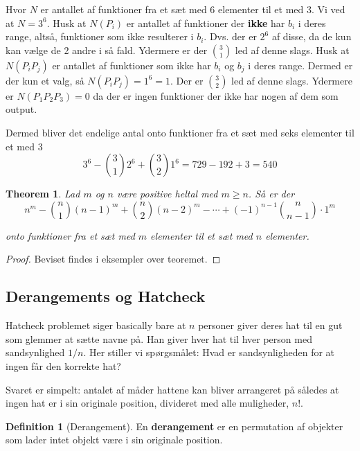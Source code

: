 \documentclass[11pt]{article}
\newtheorem{theorem}{Theorem}
\theoremstyle{definition}
\newtheorem{definition}{Definition}
\theoremstyle{remark}
\begin{document}
Hvor $N$ er antallet af funktioner fra et sæt med 6 elementer til et med 3. Vi ved at $N = 3^{6}$. Husk at $N(P_{i})$ er antallet af funktioner der \textbf{ikke} har $b_{i}$ i deres range, altså, funktioner som ikke resulterer i $b_{i}$. Dvs. der er $2^{6}$ af disse, da de kun kan vælge de 2 andre i så fald. Ydermere er der $\binom{3}{1}$ led af denne slags. Husk at$N(P_{i}P_{j})$ er antallet af funktioner som ikke har $b_{i}$ og $b_{j}$ i deres range. Dermed er der kun et valg, så $N(P_{i}P_{j}) = 1^{6} = 1$. Der er $\binom{3}{2}$ led af denne slags. Ydermere er $N(P_1P_{2}P_{3})= 0$  da der er ingen funktioner der ikke har nogen af dem som output.

Dermed bliver det endelige antal onto funktioner fra et sæt med seks elementer til et med 3
\[
3^{6} - \binom{3}{1}2^{6} + \binom{3}{2}1^{6} = 729 - 192 + 3 = 540
  \]

  \begin{theorem}
    Lad $m$ og $n$ være positive heltal med $m \geq n$. Så er der
    \[
      n^{m} - \binom{n}{1}(n-1)^{m} + \binom{n}{2}(n-2)^{m} - \cdots + (-1)^{n-1}\binom{n}{n-1} \cdot 1^{m}
    \]

    onto funktioner fra et sæt med $m$ elementer til et sæt med $n$ elementer.
  \end{theorem}

  \begin{proof}
Beviset findes i eksempler over teoremet.
  \end{proof}


\subsection{Derangements og Hatcheck}
\label{subsec:label}

Hatcheck problemet siger basically bare at $n$ personer giver deres hat til en gut som glemmer at sætte navne på. Han giver hver hat til hver person med sandsynlighed $1/n$. Her stiller vi spørgsmålet: Hvad er sandsynligheden for at ingen får den korrekte hat? 

Svaret er simpelt: antalet af måder hattene kan bliver arrangeret på således at ingen hat er i sin originale position, divideret med alle muligheder, $n!$. 

\begin{definition}[Derangement]
En \textbf{derangement} er en permutation af objekter som lader intet objekt være i sin originale position.
\end{definition}
\end{document}
